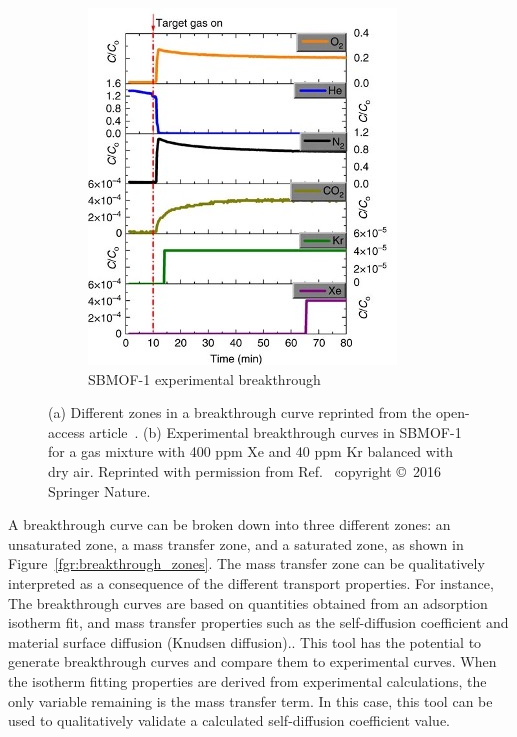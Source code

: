 \documentclass[main]{subfiles}
\begin{document}
\begin{figure}[ht]
\begin{subfigure}[b]{0.4\textwidth}
    \includegraphics[width=\textwidth]{figures/6-perspectives/sbmof_breakthrough.jpg}
    \caption{SBMOF-1 experimental breakthrough}\label{fgr:sbmof_breakthrough}
  \end{subfigure}
  \caption{ (a) Different zones in a breakthrough curve reprinted from the open-access article~\cite{Sharma_2023}. (b) Experimental breakthrough curves in SBMOF-1 for a gas mixture with 400 ppm Xe and 40 ppm Kr balanced with dry air. Reprinted with permission from Ref.~\cite{Banerjee_2016} copyright \copyright\ 2016 Springer Nature. }\label{fgr:breakthrough}
\end{figure}

A breakthrough curve can be broken down into three different zones: an unsaturated zone, a mass transfer zone, and a saturated zone, as shown in Figure~\ref{fgr:breakthrough_zones}. The mass transfer zone can be qualitatively interpreted as a consequence of the different transport properties. For instance, The breakthrough curves are based on quantities obtained from an adsorption isotherm fit, and mass transfer properties such as the self-diffusion coefficient and material surface diffusion (Knudsen diffusion).\autocite{Sharma_2023}. This tool has the potential to generate breakthrough curves and compare them to experimental curves. When the isotherm fitting properties are derived from experimental calculations, the only variable remaining is the mass transfer term. In this case, this tool can be used to qualitatively validate a calculated self-diffusion coefficient value.
\end{document}
